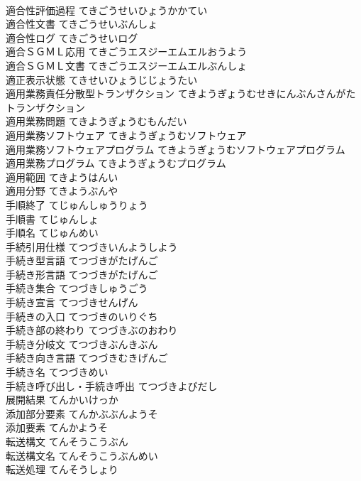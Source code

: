 \documentclass[8pt]{extreport}
\begin{document}
\begin{CJK}{UTF8}{min}
\\	適合性評価過程	てきごうせいひょうかかてい	
\\	適合性文書	てきごうせいぶんしょ	
\\	適合性ログ	てきごうせいログ	
\\	適合ＳＧＭＬ応用	てきごうエスジーエムエルおうよう	
\\	適合ＳＧＭＬ文書	てきごうエスジーエムエルぶんしょ	
\\	適正表示状態	てきせいひょうじじょうたい	
\\	適用業務責任分散型トランザクション	てきようぎょうむせきにんぶんさんがたトランザクション	
\\	適用業務問題	てきようぎょうむもんだい	
\\	適用業務ソフトウェア	てきようぎょうむソフトウェア	
\\	適用業務ソフトウェアプログラム	てきようぎょうむソフトウェアプログラム	
\\	適用業務プログラム	てきようぎょうむプログラム	
\\	適用範囲	てきようはんい	
\\	適用分野	てきようぶんや	
\\	手順終了	てじゅんしゅうりょう	
\\	手順書	てじゅんしょ	
\\	手順名	てじゅんめい	
\\	手続引用仕様	てつづきいんようしよう	
\\	手続き型言語	てつづきがたげんご	
\\	手続き形言語	てつづきがたげんご	
\\	手続き集合	てつづきしゅうごう	
\\	手続き宣言	てつづきせんげん	
\\	手続きの入口	てつづきのいりぐち	
\\	手続き部の終わり	てつづきぶのおわり	
\\	手続き分岐文	てつづきぶんきぶん	
\\	手続き向き言語	てつづきむきげんご	
\\	手続き名	てつづきめい	
\\	手続き呼び出し・手続き呼出	てつづきよびだし	
\\	展開結果	てんかいけっか	
\\	添加部分要素	てんかぶぶんようそ	
\\	添加要素	てんかようそ	
\\	転送構文	てんそうこうぶん	
\\	転送構文名	てんそうこうぶんめい	
\\	転送処理	てんそうしょり	

\end{CJK}
\end{document}
